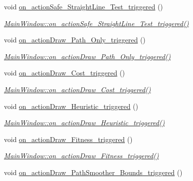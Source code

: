 \begin{DoxyCompactItemize}
void \hyperlink{class_main_window_aa5b57537f8b86d9eeebcde5271b706dd}{on\+\_\+action\+Safe\+\_\+\+Straight\+Line\+\_\+\+Test\+\_\+triggered} ()
\begin{DoxyCompactList}\small\item\em \hyperlink{class_main_window_aa5b57537f8b86d9eeebcde5271b706dd}{Main\+Window\+::on\+\_\+action\+Safe\+\_\+\+Straight\+Line\+\_\+\+Test\+\_\+triggered()} \end{DoxyCompactList}\item 
void \hyperlink{class_main_window_aa53ce2c98696444f4508a566b42e1c93}{on\+\_\+action\+Draw\+\_\+\+Path\+\_\+\+Only\+\_\+triggered} ()
\begin{DoxyCompactList}\small\item\em \hyperlink{class_main_window_aa53ce2c98696444f4508a566b42e1c93}{Main\+Window\+::on\+\_\+action\+Draw\+\_\+\+Path\+\_\+\+Only\+\_\+triggered()} \end{DoxyCompactList}\item 
void \hyperlink{class_main_window_a01e3738d5bea469303149a2764d3acc6}{on\+\_\+action\+Draw\+\_\+\+Cost\+\_\+triggered} ()
\begin{DoxyCompactList}\small\item\em \hyperlink{class_main_window_a01e3738d5bea469303149a2764d3acc6}{Main\+Window\+::on\+\_\+action\+Draw\+\_\+\+Cost\+\_\+triggered()} \end{DoxyCompactList}\item 
void \hyperlink{class_main_window_a0b1b90a4abe0e73730a9c7fa58163c9d}{on\+\_\+action\+Draw\+\_\+\+Heuristic\+\_\+triggered} ()
\begin{DoxyCompactList}\small\item\em \hyperlink{class_main_window_a0b1b90a4abe0e73730a9c7fa58163c9d}{Main\+Window\+::on\+\_\+action\+Draw\+\_\+\+Heuristic\+\_\+triggered()} \end{DoxyCompactList}\item 
void \hyperlink{class_main_window_a52e0431a7a166f48f8297a05eb42865d}{on\+\_\+action\+Draw\+\_\+\+Fitness\+\_\+triggered} ()
\begin{DoxyCompactList}\small\item\em \hyperlink{class_main_window_a52e0431a7a166f48f8297a05eb42865d}{Main\+Window\+::on\+\_\+action\+Draw\+\_\+\+Fitness\+\_\+triggered()} \end{DoxyCompactList}\item 
void \hyperlink{class_main_window_a7330dbe2178ee265a4b88c11d7c6f566}{on\+\_\+action\+Draw\+\_\+\+Path\+Smoother\+\_\+\+Bounds\+\_\+triggered} ()

\end{DoxyCompactItemize}
